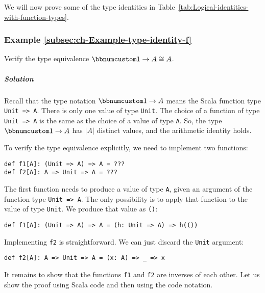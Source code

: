 We will now prove some of the type identities in Table~\ref{tab:Logical-identities-with-function-types}.

\subsubsection{Example \label{subsec:ch-Example-type-identity-f}\ref{subsec:ch-Example-type-identity-f}}

Verify the type equivalence $\bbnum 1\rightarrow A\cong A$.

\subparagraph{Solution}

Recall that the type notation $\bbnum 1\rightarrow A$ means the Scala
function type \lstinline!Unit => A!. There is only one value of type
\lstinline!Unit!. The choice of a function of type \lstinline!Unit => A!
is the same as the choice of a value of type \lstinline!A!. So, the
type $\bbnum 1\rightarrow A$ has $\left|A\right|$ distinct values,
and the arithmetic identity holds.

To verify the type equivalence explicitly, we need to implement two
functions:
\begin{lstlisting}
def f1[A]: (Unit => A) => A = ???
def f2[A]: A => Unit => A = ???
\end{lstlisting}
The first function needs to produce a value of type \lstinline!A!,
given an argument of the function type \lstinline!Unit => A!. The
only possibility is to apply that function to the value of type \lstinline!Unit!.
We produce that value as \lstinline!()!:
\begin{lstlisting}
def f1[A]: (Unit => A) => A = (h: Unit => A) => h(())
\end{lstlisting}
Implementing \lstinline!f2! is straightforward. We can just discard
the \lstinline!Unit! argument:
\begin{lstlisting}
def f2[A]: A => Unit => A = (x: A) => _ => x
\end{lstlisting}
It remains to show that the functions \lstinline!f1! and \lstinline!f2!
are inverses of each other. Let us show the proof using Scala code
and then using the code notation.

